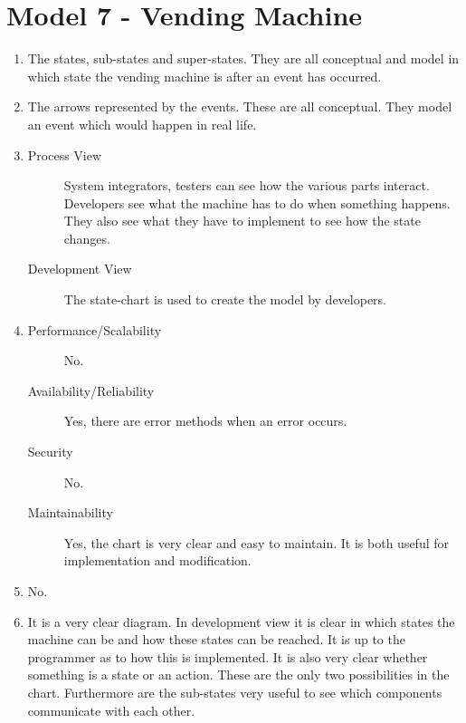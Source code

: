 \section{Model 7 - Vending Machine}
\begin{enumerate}
	\item The states, sub-states and super-states.
	They are all conceptual and model in which state the vending machine is after an event has occurred.
	
	\item The arrows represented by the events.
	These are all conceptual.
	They model an event which would happen in real life.
	
	\item
	\begin{description}
		\item[Process View] System integrators, testers can see how the various parts interact.
		Developers see what the machine has to do when something happens. They also see what they have to implement to see how the state changes.
		\item[Development View] The state-chart is used to create the model by developers.
	\end{description}
	
	\item
	\begin{description}
		\item[Performance/Scalability] No.
		\item[Availability/Reliability] Yes, there are error methods when an error occurs.
		\item[Security] No.
		\item[Maintainability] Yes, the chart is very clear and easy to maintain.
		It is both useful for implementation and modification.
	\end{description}
	
	\item No.
	
	\item It is a very clear diagram.
	In development view it is clear in which states the machine can be and how these states can be reached.
	It is up to the programmer as to how this is implemented.
	It is also very clear whether something is a state or an action.
	These are the only two possibilities in the chart.
	Furthermore are the sub-states very useful to see which components communicate with each other.
\end{enumerate} 
